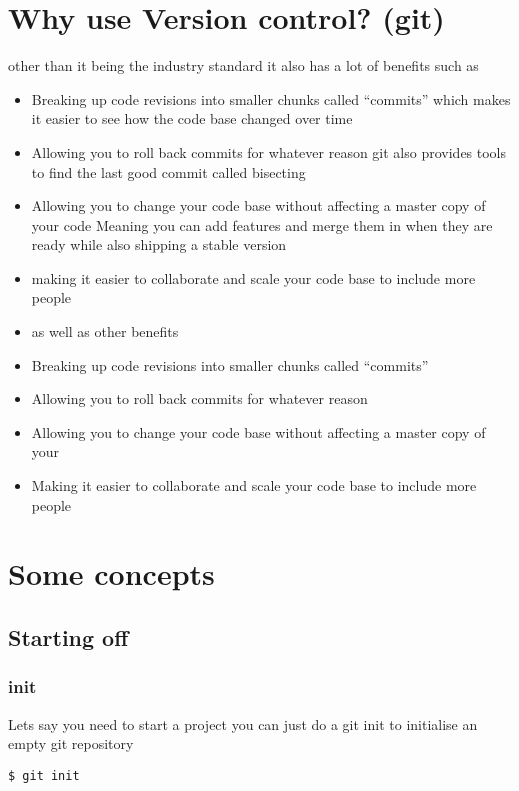 \documentclass[a4paper]{article}
\begin{document}
\section*{Why use Version control? (git)}
\label{sec:org8fede77}
\begin{notes}
	other than it being the industry standard it also has a lot of benefits such as
	\begin{itemize}
		\item Breaking up code revisions into smaller chunks called ``commits''
		      which makes it easier to see how the code base changed over time
		\item Allowing you to roll back commits for whatever reason
		      git also provides tools to find the last good commit called bisecting
		\item Allowing you to change your code base without affecting a master copy of your
		      code
		      Meaning you can add features and merge them in when they are ready while also
		      shipping a stable version
		\item making it easier to collaborate and scale your code base to include more people
		\item as well as other benefits
	\end{itemize}
\end{notes}

\begin{itemize}
	\item Breaking up code revisions into smaller chunks called ``commits''
	\item Allowing you to roll back commits for whatever reason
	\item Allowing you to change your code base without affecting a master copy of your
	\item Making it easier to collaborate and scale your code base to include more people
\end{itemize}

\section*{Some concepts}
\label{sec:orgf57a2f8}
\subsection*{Starting off}
\label{sec:orgddcaaa3}
\subsubsection*{init}
\label{sec:org16b4633}
\begin{notes}
	Lets say you need to start a project you can just do a git init to initialise an
	empty git repository
\end{notes}
\begin{verbatim}
$ git init
\end{verbatim}
\end{document}
